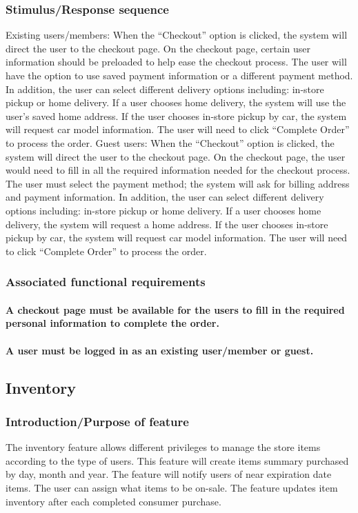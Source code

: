 \documentclass{scrreprt}
\begin{document}
\subsubsection{Stimulus/Response sequence}
Existing users/members:
When the “Checkout” option is clicked, the system will direct the user to the checkout page. On the checkout page, certain user information should be preloaded to help ease the checkout process. The user will have the option to use saved payment information or a different payment method. In addition, the user can select different delivery options including: in-store pickup or home delivery. If a user chooses home delivery, the system will use the user's saved home address. If the user chooses in-store pickup by car, the system will request car model information. The user will need to click “Complete Order” to process the order.
Guest users: 
When the “Checkout” option is clicked, the system will direct the user to the checkout page. On the checkout page, the user would need to fill in all the required information needed for the checkout process. The user must select the payment method; the system will ask for billing address and payment information. In addition, the user can select different delivery options including: in-store pickup or home delivery. If a user chooses home delivery, the system will request a home address. If the user chooses in-store pickup by car, the system will request car model information. The user will need to click “Complete Order” to process the order.


\subsubsection{Associated functional requirements}
\paragraph[]{\normalfont A checkout page must be available for the users to fill in the required personal information to complete the order.}
\paragraph[]{\normalfont A user must be logged in as an existing user/member or guest.}

\subsection{Inventory}
\subsubsection{Introduction/Purpose of feature}
The inventory feature allows different privileges to manage the store items according to the type of users. This feature will create items summary purchased by day, month and year. The feature will notify users of near expiration date items. The user can assign what items to be on-sale. The feature updates item inventory after each completed consumer purchase.
\end{document}
